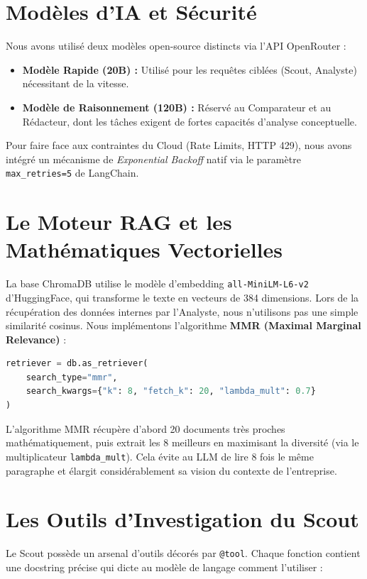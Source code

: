 \documentclass[12pt,a4paper]{report}
\begin{document}
\section{Modèles d'IA et Sécurité}
Nous avons utilisé deux modèles open-source distincts via l'API OpenRouter :
\begin{itemize}
    \item \textbf{Modèle Rapide (20B) :} Utilisé pour les requêtes ciblées (Scout, Analyste) nécessitant de la vitesse.
    \item \textbf{Modèle de Raisonnement (120B) :} Réservé au Comparateur et au Rédacteur, dont les tâches exigent de fortes capacités d'analyse conceptuelle.
\end{itemize}

Pour faire face aux contraintes du Cloud (Rate Limits, HTTP 429), nous avons intégré un mécanisme de \textit{Exponential Backoff} natif via le paramètre \texttt{max\_retries=5} de LangChain.

\section{Le Moteur RAG et les Mathématiques Vectorielles}
La base ChromaDB utilise le modèle d'embedding \texttt{all-MiniLM-L6-v2} d'HuggingFace, qui transforme le texte en vecteurs de 384 dimensions. Lors de la récupération des données internes par l'Analyste, nous n'utilisons pas une simple similarité cosinus. Nous implémentons l'algorithme \textbf{MMR (Maximal Marginal Relevance)} :

\begin{lstlisting}[language=Python]
retriever = db.as_retriever(
    search_type="mmr", 
    search_kwargs={"k": 8, "fetch_k": 20, "lambda_mult": 0.7}
)
\end{lstlisting}

L'algorithme MMR récupère d'abord 20 documents très proches mathématiquement, puis extrait les 8 meilleurs en maximisant la diversité (via le multiplicateur \texttt{lambda\_mult}). Cela évite au LLM de lire 8 fois le même paragraphe et élargit considérablement sa vision du contexte de l'entreprise.

\section{Les Outils d'Investigation du Scout}
Le Scout possède un arsenal d'outils décorés par \texttt{@tool}. Chaque fonction contient une docstring précise qui dicte au modèle de langage comment l'utiliser :
\end{document}
